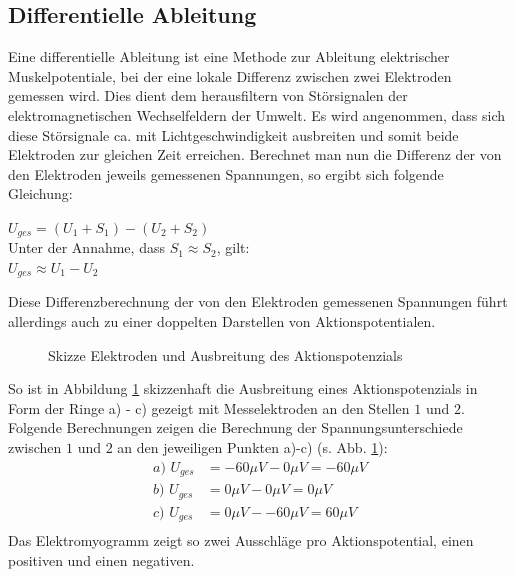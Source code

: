 \documentclass[11pt]{article}
\begin{document}
\subsection{Differentielle Ableitung}\label{differentiell}
Eine differentielle Ableitung ist eine Methode zur Ableitung elektrischer Muskelpotentiale, bei der eine lokale Differenz zwischen zwei Elektroden gemessen wird. Dies dient dem herausfiltern von Störsignalen der elektromagnetischen Wechselfeldern der Umwelt. Es wird angenommen, dass sich diese Störsignale ca. mit Lichtgeschwindigkeit ausbreiten und somit beide Elektroden zur gleichen Zeit erreichen. Berechnet man nun die Differenz der von den Elektroden jeweils gemessenen Spannungen, so ergibt sich folgende Gleichung:
\begin{center}
$U_{ges}= (U_1+S_1) - (U_2 + S_2)$ \\

Unter der Annahme, dass $S_1 \approx S_2$, gilt: \\

$U_{ges} \approx U_1 - U_2$
\end{center}

Diese Differenzberechnung der von den Elektroden gemessenen Spannungen führt allerdings auch zu einer doppelten Darstellen von Aktionspotentialen.
\begin{figure}[H]
\caption{Skizze Elektroden und Ausbreitung des Aktionspotenzials}
\label{diff}
\end{figure}
So ist in Abbildung \ref{diff} skizzenhaft die Ausbreitung eines Aktionspotenzials in Form der Ringe a) - c) gezeigt mit Messelektroden an den Stellen $1$ und $2$. Folgende Berechnungen zeigen die Berechnung der Spannungsunterschiede zwischen $1$ und $2$ an den jeweiligen Punkten a)-c) (s. Abb. \ref{diff}):
\begin{align*}
a)\,\, U_{ges} &= -60\mu V - 0\mu V =  -60\mu V\\
b)\,\, U_{ges} &= 0\mu V - 0\mu V =  0\mu V\\
c)\,\, U_{ges} &= 0\mu V - -60\mu V =  60\mu V\\
\end{align*}
Das Elektromyogramm zeigt so zwei Ausschläge pro Aktionspotential, einen positiven und einen negativen. 
\end{document}
